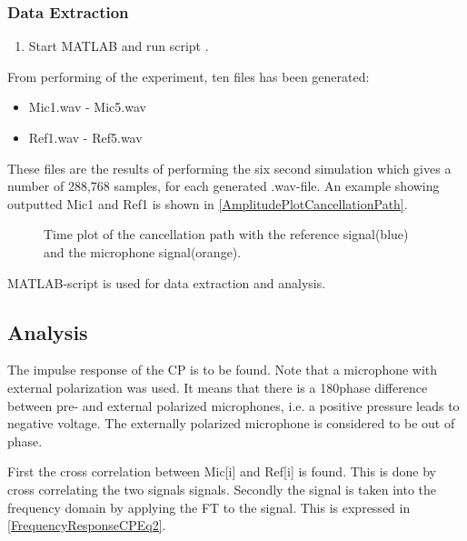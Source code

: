 \subsubsection{Data Extraction}
\begin{enumerate}
	\item Start MATLAB\textsuperscript{\textregistered} and run script .
\end{enumerate}
From performing of the experiment, ten files has been generated:
\begin{itemize}
	\item Mic1.wav - Mic5.wav
	\item Ref1.wav - Ref5.wav
\end{itemize}

These files are the results of performing the six second simulation which gives a number of 288,768 samples, for each generated .wav-file.
An example showing outputted Mic1 and Ref1 is shown in  \autoref{AmplitudePlotCancellationPath}.

\begin{figure}[H]
	\centering
	
	\caption{Time plot of the cancellation path with the reference signal(blue) and the microphone signal(orange).}
	\label{AmplitudePlotCancellationPath}
\end{figure}

MATLAB\textsuperscript{\textregistered}-script  is used for data extraction and analysis.



\subsection{Analysis}
The impulse response of the CP is to be found.
Note that a microphone with external polarization was used. It means that there is a 180\textdegree phase difference between pre- and external polarized microphones, i.e. a positive pressure leads to negative voltage. The externally polarized microphone is considered to be out of phase. \cite{michandbook}

First the cross correlation between Mic[i] and Ref[i] is found. This is done by cross correlating the two signals signals. Secondly the signal is taken into the frequency domain by applying the FT to the signal. This is expressed in \autoref{FrequencyResponseCPEq2}.



